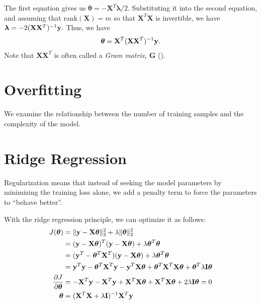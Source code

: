 The first equation gives us $\boldsymbol{\theta} = -\mathbf{X}^T\boldsymbol{\lambda}/2$. Substituting it into the second equation, and assuming that rank$(\mathbf{X})=m$ so that $\mathbf{X}^T\mathbf{X}$ is invertible, we have $\boldsymbol{\lambda} = -2 (\mathbf{X}\mathbf{X}^T)^{-1}{\mathbf{y}}.$ Thus, we have
\begin{align*}
	\boldsymbol{\theta} = \mathbf{X}^T(\mathbf{X}\mathbf{X}^T)^{-1}{\mathbf{y}}.
\end{align*}
Note that $\mathbf{X}\mathbf{X}^T$ is often called a \textit{Gram matrix}, $\mathbf{G}$ (\cf {}). 

\section{Overfitting}
We examine the relationship between the number of training samples and the complexity of the model.


\section{Ridge Regression}
Regularization means that instead of seeking the model parameters by minimizing the training loss alone, we add a penalty term to force the parameters to ``behave better''. 


With the ridge regression principle, we can optimize it as follows:
\begin{align}
	J(\boldsymbol{\theta}) &= \|\mathbf{y}-\mathbf{X}\boldsymbol{\theta}\|^2_2 + \lambda \|\boldsymbol{\theta}\|^2_2 \\
			&= (\mathbf{y}-\mathbf{X}\boldsymbol{\theta})^T(\mathbf{y}-\mathbf{X}\boldsymbol{\theta})+\lambda\boldsymbol{\theta}^T\boldsymbol{\theta}\\
			&= (\mathbf{y}^T-\boldsymbol{\theta}^T\mathbf{X}^T)(\mathbf{y}-\mathbf{X}\boldsymbol{\theta})+\lambda\boldsymbol{\theta}^T\boldsymbol{\theta}\\
			&= {\mathbf{y}}^T{\mathbf{y}}-\boldsymbol{\theta}^T\mathbf{X}^T{\mathbf{y}}-{\mathbf{y}}^T\mathbf{X}\boldsymbol{\theta}+\boldsymbol{\theta}^T\mathbf{X}^T\mathbf{X}\boldsymbol{\theta}+\boldsymbol{\theta}^T\lambda\mathbf{I}\boldsymbol{\theta}\\
	\frac{\partial J}{\partial \boldsymbol{\theta}}&= -\mathbf{X}^T{\mathbf{y}}-\mathbf{X}^T{\mathbf{y}}+\mathbf{X}^T\mathbf{X}\boldsymbol{\theta}+\mathbf{X}^T\mathbf{X}\boldsymbol{\theta}+2\lambda\mathbf{I}\boldsymbol{\theta} = 0\\
	\boldsymbol{\theta}	&= (\mathbf{X}^T\mathbf{X}+\lambda\mathbf{I})^{-1}\mathbf{X}^T{\mathbf{y}}
	\label{eq:ridge_regression}
\end{align}

